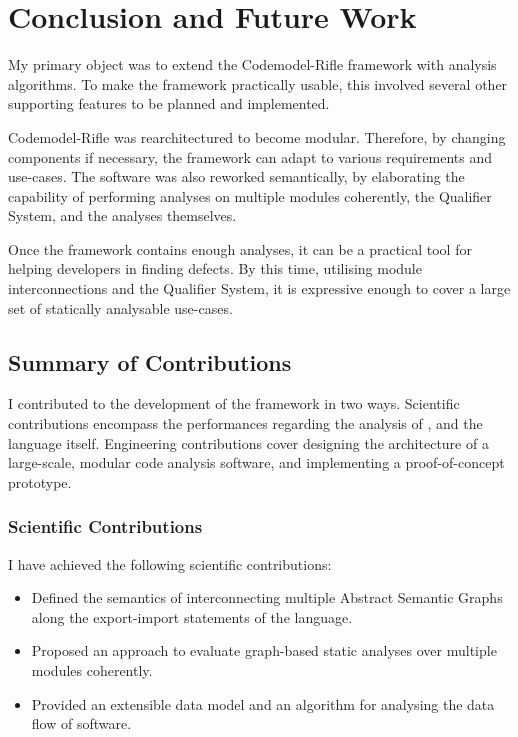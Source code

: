 \chapter{Conclusion and Future Work}
\label{chapter:conclusion}

My primary object was to extend the Codemodel-Rifle framework with analysis algorithms. To make the framework practically usable, this involved several other supporting features to be planned and implemented.

Codemodel-Rifle was rearchitectured to become modular. Therefore, by changing components if necessary, the framework can adapt to various requirements and use-cases. The software was also reworked semantically, by elaborating the capability of performing analyses on multiple modules coherently, the Qualifier System, and the analyses themselves.

Once the framework contains enough analyses, it can be a practical tool for helping developers in finding defects. By this time, utilising module interconnections and the Qualifier System, it is expressive enough to cover a large set of statically analysable use-cases.


\section{Summary of Contributions}

I contributed to the development of the framework in two ways. Scientific contributions encompass the performances regarding the analysis of \es, and the language itself. Engineering contributions cover designing the architecture of a large-scale, modular code analysis software, and implementing a proof-of-concept prototype.


\subsection{Scientific Contributions}

I have achieved the following scientific contributions:

\begin{itemize}
\item Defined the semantics of interconnecting multiple Abstract Semantic Graphs along the export-import statements of the \es language.
\item Proposed an approach to evaluate graph-based static analyses over multiple \es modules coherently.
\item Provided an extensible data model and an algorithm for analysing the data flow of \es software.
\end{itemize}


